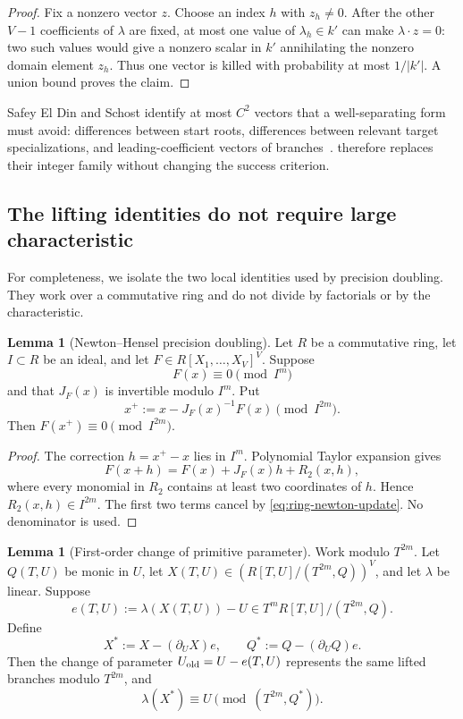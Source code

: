 \documentclass[11pt,a4paper]{article}
\theoremstyle{definition}
\newtheorem{lemma}[theorem]{Lemma}
\theoremstyle{remark}
\begin{document}
\begin{proof}
Fix a nonzero vector $z$.  Choose an index $h$ with $z_h\ne0$.  After the other $V-1$ coefficients of $\lambda$ are fixed, at most one value of $\lambda_h\in k'$ can make $\lambda\cdot z=0$: two such values would give a nonzero scalar in $k'$ annihilating the nonzero domain element $z_h$.  Thus one vector is killed with probability at most $1/|k'|$.  A union bound proves the claim.
\end{proof}

Safey El Din and Schost identify at most $C^2$ vectors that a well-separating form must avoid: differences between start roots, differences between relevant target specializations, and leading-coefficient vectors of branches~\cite[Lem.~14 and Rem.~15]{SafeySchost2018}.   therefore replaces their integer family without changing the success criterion.

\subsection{The lifting identities do not require large characteristic}
For completeness, we isolate the two local identities used by precision doubling.  They work over a commutative ring and do not divide by factorials or by the characteristic.

\begin{lemma}[Newton--Hensel precision doubling]\label{lem:ring-newton-hensel}
Let $R$ be a commutative ring, let $I\subset R$ be an ideal, and let
$F\in R[X_1,\ldots,X_V]^V$.  Suppose
\[
 F(x)\equiv0\pmod{I^m}
\]
and that $J_F(x)$ is invertible modulo $I^m$.  Put
\begin{equation}\label{eq:ring-newton-update}
 x^+:=x-J_F(x)^{-1}F(x)\pmod{I^{2m}}.
\end{equation}
Then $F(x^+)\equiv0\pmod{I^{2m}}$.
\end{lemma}

\begin{proof}
The correction $h=x^+-x$ lies in $I^m$.  Polynomial Taylor expansion gives
\[
 F(x+h)=F(x)+J_F(x)h+R_2(x,h),
\]
where every monomial in $R_2$ contains at least two coordinates of $h$.  Hence
$R_2(x,h)\in I^{2m}$.  The first two terms cancel by \eqref{eq:ring-newton-update}.  No denominator is used.
\end{proof}

\begin{lemma}[First-order change of primitive parameter]\label{lem:primitive-renormalization}
Work modulo $T^{2m}$.  Let $Q(T,U)$ be monic in $U$, let
$X(T,U)\in(R[T,U]/(T^{2m},Q))^V$, and let $\lambda$ be linear.  Suppose
\[
 e(T,U):=\lambda(X(T,U))-U\in T^mR[T,U]/(T^{2m},Q).
\]
Define
\begin{equation}\label{eq:primitive-update}
 X^*:=X-(\partial_U X)e,
 \qquad
 Q^*:=Q-(\partial_U Q)e.
\end{equation}
Then the change of parameter $U_{\rm old}=U-e(T,U)$ represents the same lifted branches modulo $T^{2m}$, and
\begin{equation}\label{eq:primitive-restored}
 \lambda(X^*)\equiv U\pmod{(T^{2m},Q^*)}.
\end{equation}
\end{lemma}
\end{document}
